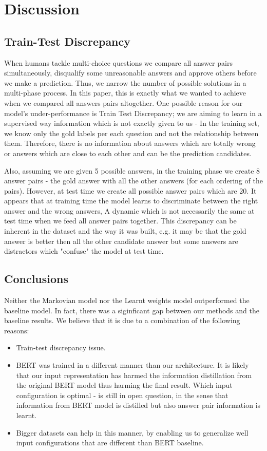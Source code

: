 \documentclass{article}
\begin{document}
\section{Discussion}
\subsection{Train-Test Discrepancy}
When humans tackle multi-choice questions we compare all answer pairs simultaneously, disqualify some unreasonable answers and approve others before we make a prediction. Thus, we narrow the number of possible solutions in a multi-phase process. In this paper, this is exactly what we wanted to achieve when we compared all answers pairs altogether. One possible reason for our model's under-performance is Train Test Discrepancy; we are aiming to learn in a supervised way information which is not exactly given to us - In the training set, we know only the gold labels per each question and not the relationship between them. Therefore, there is no information about answers which are totally wrong or answers which are close to each other and can be the prediction candidates. 

Also, assuming we are given 5 possible answers, in the training phase we create 8 answer pairs - the gold answer with all the other answers (for each ordering of the pairs). However, at test time we create all possible answer pairs which are 20. It appears that at training time the model learns to discriminate between the right answer and the wrong answers, A dynamic which is not necessarily the same at test time when we feed all answer pairs together. This discrepancy can be inherent in the dataset and the way it was built, e.g. it may be that the gold answer is better then all the other candidate answer but some answers are distractors which "confuse" the model at test time.

\subsection{Conclusions}
Neither the Markovian model nor the Learnt weights model outperformed the baseline model. In fact, there was a siginficant gap between our methods and the baseline results. We believe that it is due to a combination of the following reasons:
\begin{itemize}
\item Train-test discrepancy issue.
\item BERT was trained in a different manner than our architecture. It is likely  that our input representation has harmed the information distillation from the original BERT model thus harming the final result. Which input configuration is optimal - is still in open question, in the sense that information from BERT model is distilled but also answer pair information is learnt. 
\item  Bigger datasets can help in this manner, by enabling us to generalize well input configurations that are different than BERT baseline.
\end{itemize}
\end{document}
